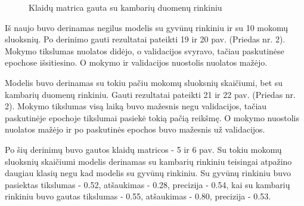 \documentclass{VUMIFPSbakalaurinis}
\begin{document}
\begin{figure}[!htbp]
\begin{minipage}[b]{0.48\textwidth}
      \caption{Klaidų matrica gauta su kambarių duomenų rinkiniu}
    \end{minipage}
\end{figure}

Iš naujo buvo derinamas negilus modelis su gyvūnų rinkiniu ir su 10 mokomų sluoksnių. 
Po derinimo gauti rezultatai pateikti 19 ir 20 pav. (Priedas nr. 2). Mokymo tikslumas nuolatos didėjo, o validacijos svyravo, tačiau paskutinėse epochose išsitiesino. O mokymo ir validacijos nuostolis nuolatos mažėjo.

Modelis buvo derinamas su tokiu pačiu mokomų sluoksnių skaičiumi, bet su kambarių duomenų rinkiniu.
Gauti rezultatai pateikti 21 ir 22 pav. (Priedas nr. 2). Mokymo tikslumas visą laiką buvo mažesnis negu validacijos, tačiau paskutinėje epochoje tikslumai pasiekė tokią pačią reikšmę. O mokymo nuostolis nuolatos mažėjo ir po paskutinės epochos buvo mažesnis už validacijos. 

Po šių derinimų buvo gautos klaidų matricos - 5 ir 6 pav. Su tokiu mokomų sluoksnių skaičiumi modelis derinamas su kambarių rinkiniu teisingai atpažino daugiau klasių negu kad modelis su gyvūnų rinkiniu. 
Su gyvūnų rinkiniu buvo pasiektas tikslumas - 0.52, atšaukimas - 0.28, precizija - 0.54, kai su kambarių rinkiniu buvo gautas tikslumas - 0.55, atšaukimas - 0.80, precizija - 0.53.
\end{document}

